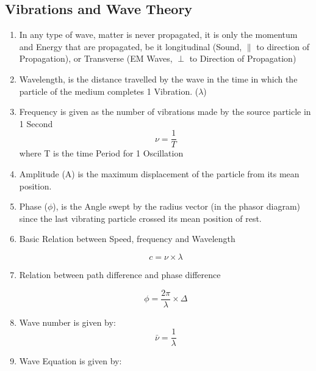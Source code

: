 \documentclass[12pt]{article}
\begin{document}
\subsection{Vibrations and Wave Theory}
\begin{enumerate}
	
	\item In any type of wave, matter is never propagated, it is only the momentum and Energy that are propagated, be it longitudinal (Sound, $\parallel$ to direction of Propagation), or Transverse (EM Waves, $\perp$ to Direction of Propagation)
	
	
	\item Wavelength, is the distance travelled by the wave in the time in which the particle of the medium completes 1 Vibration. ($\lambda$)
	
	\item Frequency is given as the number of vibrations made by the source particle in 1 Second
	\begin{equation}
		\nu = \frac{1}{T}
	\end{equation}
	where T is the time Period for 1 Oscillation
	
	\item Amplitude (A) is the maximum displacement of the particle from its mean position.
	
	\item Phase ($\phi$),  is the Angle swept by the radius vector (in the phasor diagram) since the last vibrating particle crossed its mean position of rest. 
	
	\item Basic Relation between Speed, frequency and Wavelength
	
	\begin{equation}
		c = \nu \times \lambda	
	\end{equation}
	
	\item Relation between path difference and phase difference
	
	\begin{equation}
		\phi = \frac{2\pi}{\lambda}\times \Delta
	\end{equation}
	
	\item Wave number is given by: 
	\begin{equation}
		\bar{\nu} = \frac{1}{\lambda}
	\end{equation}
	
	
	\item Wave Equation is given by:
	

\end{enumerate}
\end{document}
